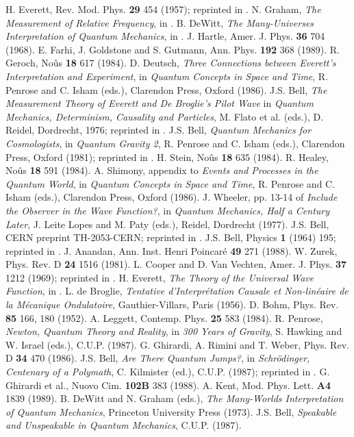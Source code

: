 \documentclass[aps,pra,12pt]{revtex4}
\begin{document}
\begin{thebibliography}{99.}
H. Everett, Rev. Mod. Phys. {\bf 29} 454  (1957); reprinted in \cite{mwbook}.
N. Graham, {\it The Measurement of Relative Frequency}, in \cite{mwbook}.
B. DeWitt, {\it The Many-Universes Interpretation of Quantum Mechanics}, in
\cite{mwbook}.
J. Hartle, Amer. J. Phys. {\bf 36} 704 (1968). 
E. Farhi, J. Goldstone and S. Gutmann, Ann. Phys. {\bf 192} 368 (1989). 
R. Geroch, No\^{u}s {\bf 18} 617 (1984).
D. Deutsch, {\it Three Connections between Everett's Interpretation and 
Experiment}, in {\it Quantum Concepts in Space and Time}, R. Penrose and
C. Isham (eds.), Clarendon Press, Oxford (1986). 
J.S. Bell, {\it The Measurement Theory of Everett and De Broglie's Pilot Wave}
in {\it Quantum Mechanics, Determinism, Causality and Particles}, M. Flato
et al. (eds.), D. Reidel, Dordrecht, 1976; reprinted in \cite{bellbook}.
J.S. Bell, {\it Quantum Mechanics for Cosmologists}, 
in {\it Quantum Gravity 2},
R. Penrose and C. Isham (eds.), Clarendon Press, Oxford (1981);
reprinted in \cite{bellbook}.
H. Stein, No\^{u}s {\bf 18} 635 (1984).
R. Healey, No\^{u}s {\bf 18} 591 (1984).
A. Shimony, appendix to {\it Events and Processes in the Quantum World}, in 
{\it Quantum Concepts in Space and Time}, R. Penrose and
C. Isham (eds.), Clarendon Press, Oxford (1986). 
J. Wheeler, pp. 13-14 of {\it Include the Observer in the Wave Function?}, in 
{\it Quantum Mechanics, Half a Century Later}, 
J. Leite Lopes and M. Paty (eds.),
Reidel, Dordrecht (1977). 
J.S. Bell, CERN preprint TH-2053-CERN; reprinted in \cite{bellbook}.
J.S. Bell, Physics {\bf 1} (1964) 195; reprinted in \cite{bellbook}.
J. Anandan, Ann. Inst. Henri Poincar\'{e} {\bf 49} 271 (1988). 
W. Zurek, Phys. Rev. D {\bf 24} 1516 (1981).
L. Cooper and D. Van Vechten, Amer. J. Phys. {\bf 37} 1212 (1969);
reprinted in \cite{mwbook}.
H. Everett, {\it The Theory of the Universal Wave Function}, 
in \cite{mwbook}.
L. de Broglie, {\it Tentative d'Interpr\'{e}tation Causale et Non-lin\'{e}aire
de la M\'{e}canique Ondulatoire}, Gauthier-Villars, Paris (1956). 
D. Bohm, Phys. Rev. {\bf 85} 166, 180 (1952). 
A. Leggett, Contemp. Phys. {\bf 25} 583 (1984). 
R. Penrose, {\it Newton, Quantum Theory and Reality}, in 
{\it 300 Years of Gravity}, S. Hawking and W. Israel (eds.), C.U.P. (1987).
G. Ghirardi, A. Rimini and T. Weber, Phys. Rev. D {\bf 34} 470 (1986).
J.S. Bell, {\it Are There Quantum Jumps?}, in {\it 
Schr\"{o}dinger, Centenary of a Polymath}, C. Kilmister (ed.),
C.U.P. (1987);
reprinted in \cite{bellbook}. 
G. Ghirardi et al., Nuovo Cim. {\bf 102B} 383 (1988).
A. Kent, Mod. Phys. Lett. {\bf A4} 1839 (1989).    
B. DeWitt and N. Graham (eds.),
{\em The Many-Worlds Interpretation of Quantum Mechanics},
Princeton University Press (1973). 
J.S. Bell, {\em Speakable and Unspeakable in Quantum Mechanics}, 
C.U.P. (1987).
\end{thebibliography}
\end{document}
